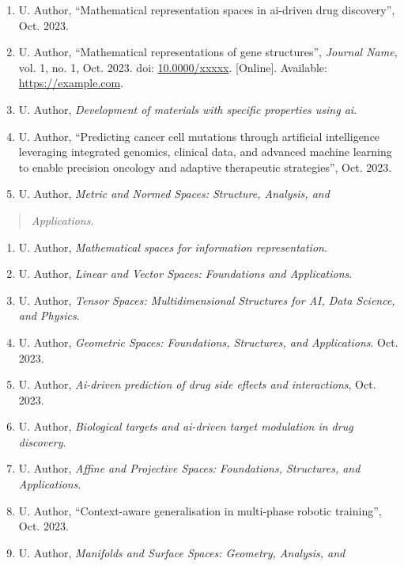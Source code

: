 \documentclass[
]{article}
\begin{document}
\begin{enumerate}
\def\labelenumi{\arabic{enumi}.}
\item
  \protect{}\label{_bookmark41}{}U. Author, ``Mathematical
  representation spaces in ai-driven drug discovery'', Oct. 2023.
\item
  \protect{}\label{_bookmark42}{}U. Author, ``Mathematical
  representations of gene structures'', \emph{Journal Name}, vol. 1, no.
  1, Oct. 2023. doi:
  \href{https://doi.org/10.0000/xxxxx}{10.0000/xxxxx}. {[}Online{]}.
  Available: \href{https://example.com/}{https://example.com}.
\item
  \protect{}\label{_bookmark43}{}U. Author,
  \emph{Development of materials with specific properties using ai}.
\item
  \protect{}\label{_bookmark44}{}U. Author, ``Predicting
  cancer cell mutations through artificial intelligence leveraging
  integrated genomics, clinical data, and advanced machine learning to
  enable precision oncology and adaptive therapeutic strategies'', Oct.
  2023.
\item
  \protect{}\label{_bookmark45}{}U. Author, \emph{Metric
  and Normed Spaces: Structure, Analysis, and}
\end{enumerate}

\begin{quote}
\emph{Applications}.
\end{quote}

\begin{enumerate}
\def\labelenumi{\arabic{enumi}.}
\setcounter{enumi}{5}
\item
  \protect{}\label{_bookmark46}{}U. Author,
  \emph{Mathematical spaces for information representation}.
\item
  \protect{}\label{_bookmark47}{}U. Author, \emph{Linear
  and Vector Spaces: Foundations and Applications}.
\item
  \protect{}\label{_bookmark48}{}U. Author, \emph{Tensor
  Spaces: Multidimensional Structures for AI, Data Science, and
  Physics}.
\item
  \protect{}\label{_bookmark49}{}U. Author, \emph{Geometric
  Spaces: Foundations, Structures, and Applications}. Oct. 2023.
\item
  \protect{}\label{_bookmark50}{}U. Author, \emph{Ai-driven
  prediction of drug side eflects and interactions}, Oct. 2023.
\item
  \protect{}\label{_bookmark51}{}U. Author,
  \emph{Biological targets and ai-driven target modulation in drug
  discovery}.
\item
  \protect{}\label{_bookmark52}{}U. Author, \emph{Affine
  and Projective Spaces: Foundations, Structures, and Applications}.
\item
  \protect{}\label{_bookmark53}{}U. Author, ``Context-aware
  generalisation in multi-phase robotic training'', Oct. 2023.
\item
  \protect{}\label{_bookmark54}{}U. Author, \emph{Manifolds
  and Surface Spaces: Geometry, Analysis, and}
\end{enumerate}
\end{document}
